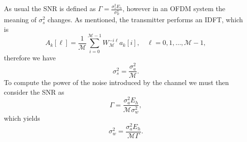 \documentclass[10pt]{article}
\newcommand{\ofdM} {\mathcal{M}}
\begin{document}
As usual the SNR is defined as $\Gamma = \frac{\sigma_s^2 E_h}{\sigma_w^2}$, however in an OFDM system the meaning of $\sigma_s^2$ changes. As mentioned, the transmitter performs an IDFT, which is
\begin{equation}
	A_k[\ell] = \frac{1}{\ofdM} \sum_{i = 0}^{\ofdM - 1} W_{\ofdM}^{-i\ell} a_k[i], \quad \ell = 0, 1, \dots, \ofdM-1,
\end{equation}
therefore we have 
\begin{equation}
	\sigma_s^2 = \dfrac{\sigma_a^2}{\ofdM}.
\end{equation}
To compute the power of the noise introduced by the channel we must then consider the SNR as
\begin{equation}
	\Gamma = \dfrac{\sigma_a^2 E_h}{\ofdM \sigma_w^2},
\end{equation}
which yields
\begin{equation}
	\sigma_w^2 = \dfrac{\sigma_a^2 E_h}{\ofdM \Gamma}.
\end{equation}
\end{document}

